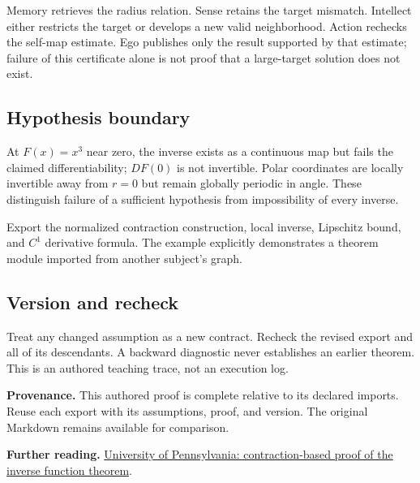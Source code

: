 \documentclass[preprint,12pt,aps,pra,showkeys,amsmath,amssymb,superscriptaddress,floatfix]{revtex4-2}
\theoremstyle{definition}
\theoremstyle{remark}
\begin{document}
Memory retrieves the radius relation. Sense retains the target mismatch.
Intellect either restricts the target or develops a new valid
neighborhood. Action rechecks the self-map estimate. Ego publishes only
the result supported by that estimate; failure of this certificate alone
is not proof that a large-target solution does not exist.

\subsection{Hypothesis boundary}
At \(F(x)=x^{3}\) near zero, the inverse exists as a continuous map but
fails the claimed differentiability; \(DF(0)\) is not invertible. Polar
coordinates are locally invertible away from \(r=0\) but remain globally
periodic in angle. These distinguish failure of a sufficient hypothesis
from impossibility of every inverse.

Export the normalized contraction construction, local inverse, Lipschitz
bound, and \(C^{1}\) derivative formula. The example explicitly
demonstrates a theorem module imported from another subject's graph.

\subsection{Version and recheck}
Treat any changed assumption as a new contract. Recheck the revised
export and all of its descendants. A backward diagnostic never
establishes an earlier theorem. This is an authored teaching trace, not
an execution log.

\par\medskip\begingroup\small\linespread{1.0}\selectfont\noindent\textbf{Provenance.} This authored proof is complete relative to its declared imports. Reuse
each export with its assumptions, proof, and version. The original
Markdown remains available for comparison.
\par\endgroup

\par\smallskip\begingroup\small\linespread{1.0}\selectfont\noindent\textbf{Further reading.} \href{https://www2.math.upenn.edu/~gressman/analysis/12-inversefuncthm.html}{University
of Pennsylvania: contraction-based proof of the inverse function
theorem}.\par\endgroup
\end{document}
